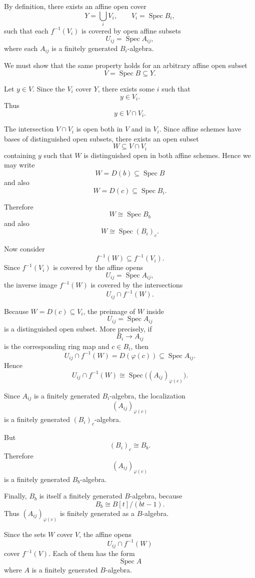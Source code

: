 \documentclass[12pt,a4paper]{article}
\theoremstyle{notespace}
\begin{document}
By definition, there exists an affine open cover
\[
Y=\bigcup_i V_i,
\qquad
V_i=\operatorname{Spec}B_i,
\]
such that each \(f^{-1}(V_i)\) is covered by open affine subsets
\[
U_{ij}=\operatorname{Spec}A_{ij},
\]
where each \(A_{ij}\) is a finitely generated \(B_i\)-algebra.

We must show that the same property holds for an arbitrary affine open subset
\[
V=\operatorname{Spec}B\subseteq Y.
\]

Let \(y\in V\). Since the \(V_i\) cover \(Y\), there exists some \(i\) such that
\[
y\in V_i.
\]
Thus
\[
y\in V\cap V_i.
\]

The intersection \(V\cap V_i\) is open both in \(V\) and in \(V_i\). Since affine schemes have bases of distinguished open subsets, there exists an open subset
\[
W\subseteq V\cap V_i
\]
containing \(y\) such that \(W\) is distinguished open in both affine schemes. Hence we may write
\[
W=D(b)\subseteq \operatorname{Spec}B
\]
and also
\[
W=D(c)\subseteq \operatorname{Spec}B_i.
\]

Therefore
\[
W\cong \operatorname{Spec}B_b
\]
and also
\[
W\cong \operatorname{Spec}(B_i)_c.
\]

Now consider
\[
f^{-1}(W)\subseteq f^{-1}(V_i).
\]
Since \(f^{-1}(V_i)\) is covered by the affine opens
\[
U_{ij}=\operatorname{Spec}A_{ij},
\]
the inverse image \(f^{-1}(W)\) is covered by the intersections
\[
U_{ij}\cap f^{-1}(W).
\]

Because \(W=D(c)\subseteq V_i\), the preimage of \(W\) inside
\[
U_{ij}=\operatorname{Spec}A_{ij}
\]
is a distinguished open subset. More precisely, if
\[
B_i\longrightarrow A_{ij}
\]
is the corresponding ring map and \(c\in B_i\), then
\[
U_{ij}\cap f^{-1}(W)
=
D(\varphi(c))
\subseteq \operatorname{Spec}A_{ij}.
\]
Hence
\[
U_{ij}\cap f^{-1}(W)
\cong
\operatorname{Spec}\bigl((A_{ij})_{\varphi(c)}\bigr).
\]

Since \(A_{ij}\) is a finitely generated \(B_i\)-algebra, the localization
\[
(A_{ij})_{\varphi(c)}
\]
is a finitely generated \((B_i)_c\)-algebra.

But
\[
(B_i)_c\cong B_b.
\]
Therefore
\[
(A_{ij})_{\varphi(c)}
\]
is a finitely generated \(B_b\)-algebra.

Finally, \(B_b\) is itself a finitely generated \(B\)-algebra, because
\[
B_b\cong B[t]/(bt-1).
\]
Thus \((A_{ij})_{\varphi(c)}\) is finitely generated as a \(B\)-algebra.

Since the sets \(W\) cover \(V\), the affine opens
\[
U_{ij}\cap f^{-1}(W)
\]
cover \(f^{-1}(V)\). Each of them has the form
\[
\operatorname{Spec}A
\]
where \(A\) is a finitely generated \(B\)-algebra.
\end{document}
